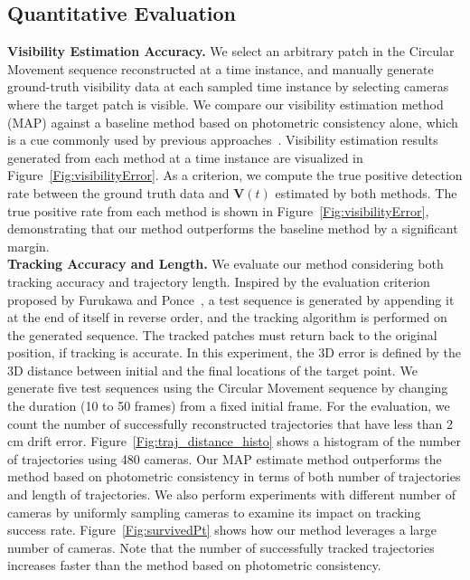 \subsection{Quantitative Evaluation}
\noindent\textbf{Visibility Estimation Accuracy.} We select an arbitrary patch in the Circular Movement sequence reconstructed at a time instance, and manually generate ground-truth visibility data at each sampled time instance by selecting cameras where the target patch is visible. We compare our visibility estimation method (MAP) against a baseline method based on photometric consistency alone, which is a cue commonly used by previous approaches~\cite{Carceroni2002,Devernay2006,Furukawa2008}. Visibility estimation results generated from each method at a time instance are visualized in Figure~\ref{Fig:visibilityError}. As a criterion, we compute the true positive detection rate between the ground truth data and $\mathbf{V}(t)$ estimated by both methods. The true positive rate from each method is shown in Figure~\ref{Fig:visibilityError}, demonstrating that our method outperforms the baseline method by a significant margin.\\ %
\noindent \textbf{Tracking Accuracy and Length.}
We evaluate our method considering both tracking accuracy and trajectory length. Inspired by the evaluation criterion proposed by Furukawa and Ponce~\cite{Furukawa2008}, a test sequence is generated by appending it at the end of itself in reverse order, and the tracking algorithm is performed on the generated sequence. The tracked patches must return back to the original position, if tracking is accurate. In this experiment, the 3D error is defined by the 3D distance between initial and the final locations of the target point. We generate five test sequences using the Circular Movement sequence by changing the duration (10 to 50 frames) from a fixed initial frame. For the evaluation, we count the number of successfully reconstructed trajectories that have less than 2 cm drift error. Figure~\ref{Fig:traj_distance_histo} shows a histogram of the number of trajectories using 480 cameras.  Our MAP estimate method outperforms the method based on photometric consistency in terms of both number of trajectories and length of trajectories. We also perform experiments with different number of cameras by uniformly sampling cameras to examine its impact on tracking success rate. Figure~\ref{Fig:survivedPt} shows how our method leverages a large number of cameras. Note that the number of successfully tracked trajectories increases faster than the method based on photometric consistency. 

